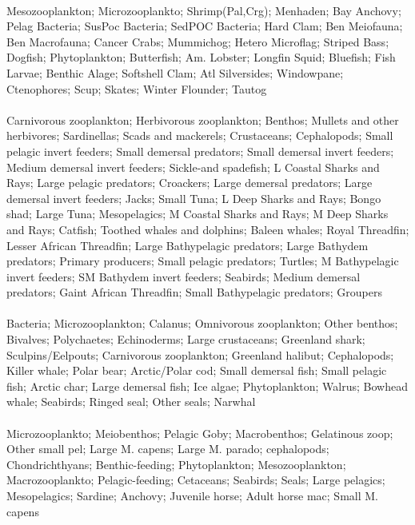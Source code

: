 \fullhline
\hline
{} \\
\hline
Mesozooplankton; Microzooplankto; Shrimp(Pal,Crg); Menhaden; Bay Anchovy; Pelag Bacteria; SusPoc Bacteria; SedPOC Bacteria; Hard Clam; Ben Meiofauna; Ben Macrofauna; Cancer Crabs; Mummichog; Hetero Microflag; Striped Bass; Dogfish; Phytoplankton; Butterfish; Am. Lobster; Longfin Squid; Bluefish; Fish Larvae; Benthic Alage; Softshell Clam; Atl Silversides; Windowpane; Ctenophores; Scup; Skates; Winter Flounder; Tautog\\
\fullhline
\hline
{} \\
\hline
Carnivorous zooplankton; Herbivorous zooplankton; Benthos; Mullets and other herbivores; Sardinellas; Scads and mackerels; Crustaceans; Cephalopods; Small pelagic invert feeders; Small demersal predators; Small demersal invert feeders; Medium demersal invert feeders; Sickle-and spadefish; L Coastal Sharks and Rays; Large pelagic predators; Croackers; Large demersal predators; Large demersal invert feeders; Jacks; Small Tuna; L Deep Sharks and Rays; Bongo shad; Large Tuna; Mesopelagics; M Coastal Sharks and Rays; M Deep Sharks and Rays; Catfish; Toothed whales and dolphins; Baleen whales; Royal Threadfin; Lesser African Threadfin; Large Bathypelagic predators; Large Bathydem predators; Primary producers; Small pelagic predators; Turtles; M Bathypelagic invert feeders; SM Bathydem invert feeders; Seabirds; Medium demersal predators; Gaint African Threadfin; Small Bathypelagic predators; Groupers\\
\fullhline
\hline
{} \\
\hline
Bacteria; Microzooplankton; Calanus; Omnivorous zooplankton; Other benthos; Bivalves; Polychaetes; Echinoderms; Large crustaceans; Greenland shark; Sculpins/Eelpouts; Carnivorous zooplankton; Greenland halibut; Cephalopods; Killer whale; Polar bear; Arctic/Polar cod; Small demersal fish; Small pelagic fish; Arctic char; Large demersal fish; Ice algae; Phytoplankton; Walrus; Bowhead whale; Seabirds; Ringed seal; Other seals; Narwhal\\
\fullhline
\hline
{} \\
\hline
Microzooplankto; Meiobenthos; Pelagic Goby; Macrobenthos; Gelatinous zoop; Other small pel; Large M. capens; Large M. parado; cephalopods; Chondrichthyans; Benthic-feeding; Phytoplankton; Mesozooplankton; Macrozooplankto; Pelagic-feeding; Cetaceans; Seabirds; Seals; Large pelagics; Mesopelagics; Sardine; Anchovy; Juvenile horse; Adult horse mac; Small M. capens\\
